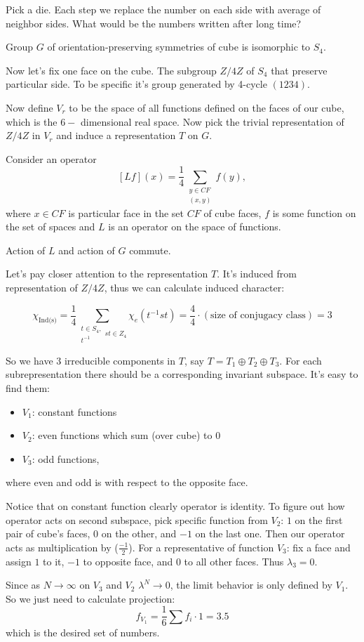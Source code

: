 \documentclass{amsart}
\begin{document}
\begin{example}
    Pick a die. Each step we replace the number on each side with average of neighbor sides.
What would be the numbers written after long time?
\end{example}

\begin{lemma}
    Group $G$ of orientation-preserving symmetries of cube is isomorphic to $S_4$.
\end{lemma}
Now let's fix one face on the cube. The subgroup $Z/4Z$ of $S_4$ that preserve particular side. To be specific it's group generated by 4-cycle $(1234)$.

Now define $V_r$ to be the space of all functions defined on the faces of our cube, which is the $6-$ dimensional real space. Now pick the trivial representation of $Z/4Z$ in $V_r$ and induce a representation $T$ on $G$.

Consider an operator $$[Lf] (x) = \frac{1}{4}\sum_{\substack{y\in CF \\ (x, y)}} f(y),$$
where $x \in CF$ is particular face in the set $CF$ of cube faces, $f$ is some function on the set of spaces and $L$ is an operator on the space of functions.

\begin{lemma}
    Action of $L$ and action of $G$ commute.
\end{lemma}

Let's pay closer attention to the representation $T$. It's induced from representation of $Z/4Z$, thus we can calculate induced character:

$$\chi_{\text{Ind(s)}} = \frac{1}{4} \sum_{\substack{t \in S_4,\\ t^{-1}} s t \in Z_4 } \chi_e (t^{-1} s t) = \frac{4}{4} \cdot (\text{size of conjugacy class}) = 3$$

So we have 3 irreducible components in $T$, say  $T = T_1 \oplus T_2 \oplus T_3$.
For each subrepresentation there should be a corresponding invariant subspace. It's easy to find them:
\begin{itemize}
    \item $V_1$: constant functions
    \item $V_2$: even functions which sum (over cube) to 0
    \item $V_3$: odd functions,
\end{itemize} 
where even and odd is with respect to the opposite face.

Notice that on constant function clearly operator is identity. To figure out how operator acts on second subspace, pick specific function from $V_2$: $1$ on the first pair of cube's faces, $0$ on the other, and $-1$ on the last one. Then our operator acts as multiplication by ($\frac{-1}{2}$).
For a representative of function $V_3$: fix a face and assign $1$ to it, $-1$ to opposite face, and $0$ to all other faces. Thus $\lambda_3 = 0$.

Since as $N \to \infty$ on $V_3$ and $V_2$ $\lambda^N \to 0$, the limit behavior is only defined by $V_1$. So we just need to calculate projection:
$$ f_{V_1} = \frac{1}{6} \sum {f_i \cdot 1} = 3.5$$
which is the desired set of numbers.
\end{document}
